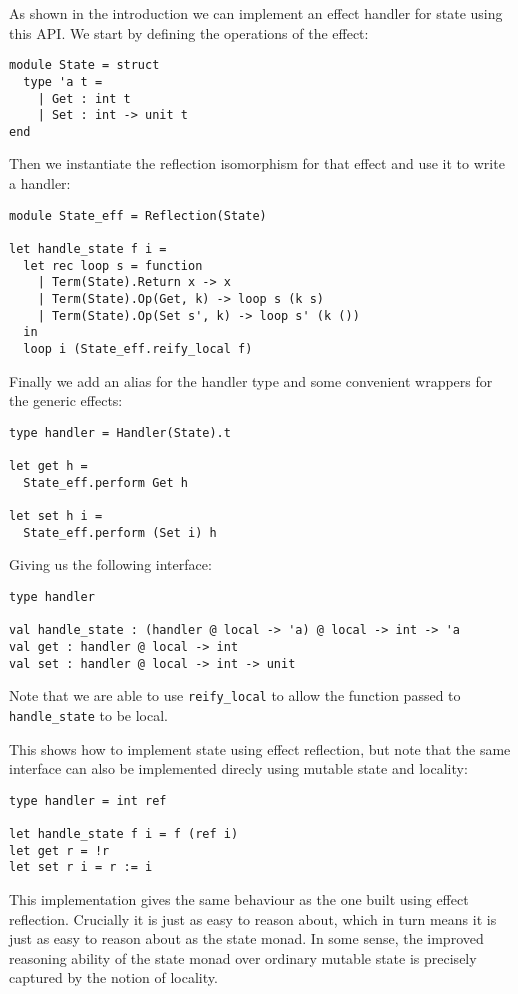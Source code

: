 \documentclass[acmsmall, screen, nonacm]{acmart}
\theoremstyle{definition}
\begin{document}
As shown in the introduction we can implement an effect handler for
state using this API. We start by defining the operations of the effect:
\begin{lstlisting}[style=ocaml]
module State = struct
  type 'a t =
    | Get : int t
    | Set : int -> unit t
end
\end{lstlisting}
Then we instantiate the reflection isomorphism for that effect and use
it to write a handler:
\begin{lstlisting}[style=ocaml]
module State_eff = Reflection(State)

let handle_state f i =
  let rec loop s = function
    | Term(State).Return x -> x
    | Term(State).Op(Get, k) -> loop s (k s)
    | Term(State).Op(Set s', k) -> loop s' (k ())
  in
  loop i (State_eff.reify_local f)
\end{lstlisting}
Finally we add an alias for the handler type and some convenient
wrappers for the generic effects:
\begin{lstlisting}[style=ocaml]
type handler = Handler(State).t

let get h =
  State_eff.perform Get h

let set h i =
  State_eff.perform (Set i) h
\end{lstlisting}
Giving us the following interface:
\begin{lstlisting}[style=ocaml]
type handler

val handle_state : (handler @ local -> 'a) @ local -> int -> 'a
val get : handler @ local -> int
val set : handler @ local -> int -> unit
\end{lstlisting}
Note that we are able to use \lstinline[style=ocaml]{reify_local} to allow
the function passed to \lstinline[style=ocaml]{handle_state} to be local.

This shows how to implement state using effect reflection, but note that
the same interface can also be implemented direcly using mutable state
and locality:
\begin{lstlisting}[style=ocaml]
type handler = int ref

let handle_state f i = f (ref i)
let get r = !r
let set r i = r := i
\end{lstlisting}
This implementation gives the same behaviour as the one built using
effect reflection. Crucially it is just as easy to reason about, which
in turn means it is just as easy to reason about as the state monad. In
some sense, the improved reasoning ability of the state monad over
ordinary mutable state is precisely captured by the notion of locality.
\end{document}
